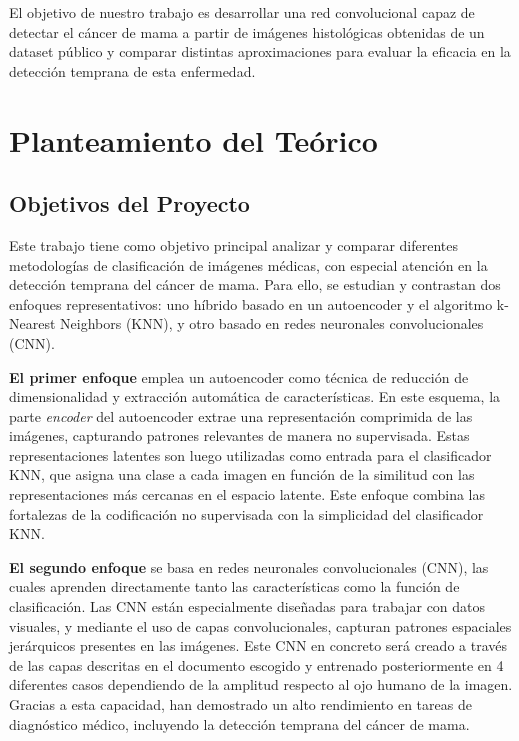 \documentclass[12pt]{article} %
\begin{document}
El objetivo de nuestro trabajo es desarrollar una red convolucional capaz de detectar el cáncer de mama a partir de imágenes histológicas obtenidas de un dataset público \cite{nasser2023deep} y comparar distintas aproximaciones para evaluar la eficacia en la detección temprana de esta enfermedad.

\newpage
\section{Planteamiento del Teórico}
\subsection{Objetivos del Proyecto}

Este trabajo tiene como objetivo principal analizar y comparar diferentes metodologías de clasificación de imágenes médicas, con especial atención en la detección temprana del cáncer de mama. Para ello, se estudian y contrastan dos enfoques representativos: uno híbrido basado en un autoencoder y el algoritmo k-Nearest Neighbors (KNN), y otro basado en redes neuronales convolucionales (CNN).

\textbf{El primer enfoque} emplea un autoencoder como técnica de reducción de dimensionalidad y extracción automática de características. En este esquema, la parte \textit{encoder} del autoencoder extrae una representación comprimida de las imágenes, capturando patrones relevantes de manera no supervisada. Estas representaciones latentes son luego utilizadas como entrada para el clasificador KNN, que asigna una clase a cada imagen en función de la similitud con las representaciones más cercanas en el espacio latente. Este enfoque combina las fortalezas de la codificación no supervisada con la simplicidad del clasificador KNN.

\textbf{El segundo enfoque} se basa en redes neuronales convolucionales (CNN), las cuales aprenden directamente tanto las características como la función de clasificación. Las CNN están especialmente diseñadas para trabajar con datos visuales, y mediante el uso de capas convolucionales, capturan patrones espaciales jerárquicos presentes en las imágenes. Este CNN en concreto será creado a través de las capas descritas en el documento escogido y entrenado posteriormente en 4 diferentes casos dependiendo de la amplitud respecto al ojo humano de la imagen. Gracias a esta capacidad, han demostrado un alto rendimiento en tareas de diagnóstico médico, incluyendo la detección temprana del cáncer de mama.
\end{document}
